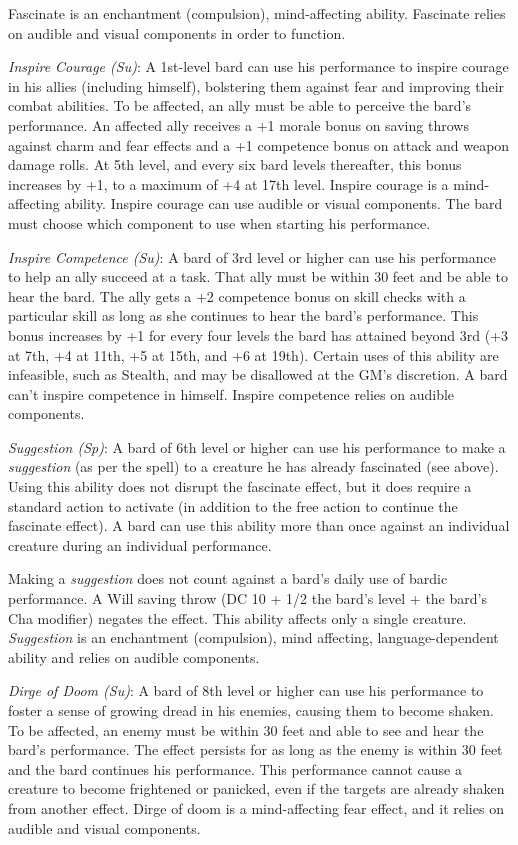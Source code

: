 Fascinate is an enchantment (compulsion), mind-affecting ability. Fascinate relies on audible and visual components in order to function. 
				
\textit{Inspire Courage (Su)}: A 1st-level bard can use his performance to inspire courage in his allies (including himself), bolstering them against fear and improving their combat abilities. To be affected, an ally must be able to perceive the bard's performance. An affected ally receives a +1 morale bonus on saving throws against charm and fear effects and a +1 competence bonus on attack and weapon damage rolls. At 5th level, and every six bard levels thereafter, this bonus increases by +1, to a maximum of +4 at 17th level. Inspire courage is a mind-affecting ability. Inspire courage can use audible or visual components. The bard must choose which component to use when starting his performance.
				
\textit{Inspire Competence (Su)}: A bard of 3rd level or higher can use his performance to help an ally succeed at a task. That ally must be within 30 feet and be able to hear the bard. The ally gets a +2 competence bonus on skill checks with a particular skill as long as she continues to hear the bard's performance. This bonus increases by +1 for every four levels the bard has attained beyond 3rd (+3 at 7th, +4 at 11th, +5 at 15th, and +6 at 19th). Certain uses of this ability are infeasible, such as Stealth, and may be disallowed at the GM's discretion. A bard can't inspire competence in himself. Inspire competence relies on audible components.
				
\textit{Suggestion (Sp)}: A bard of 6th level or higher can use his performance to make a \textit{suggestion} (as per the spell) to a creature he has already fascinated (see above). Using this ability does not disrupt the fascinate effect, but it does require a standard action to activate (in addition to the free action to continue the fascinate effect). A bard can use this ability more than once against an individual creature during an individual performance.
				
Making a \textit{suggestion} does not count against a bard's daily use of bardic performance. A Will saving throw (DC 10 + 1/2 the bard's level + the bard's Cha modifier) negates the effect. This ability affects only a single creature. \textit{Suggestion }is an enchantment (compulsion), mind affecting, language-dependent ability and relies on audible components.
				
\textit{Dirge of Doom (Su)}: A bard of 8th level or higher can use his performance to foster a sense of growing dread in his enemies, causing them to become shaken. To be affected, an enemy must be within 30 feet and able to see and hear the bard's performance. The effect persists for as long as the enemy is within 30 feet and the bard continues his performance. This performance cannot cause a creature to become frightened or panicked, even if the targets are already shaken from another effect. Dirge of doom is a mind-affecting fear effect, and it relies on audible and visual components.
				
